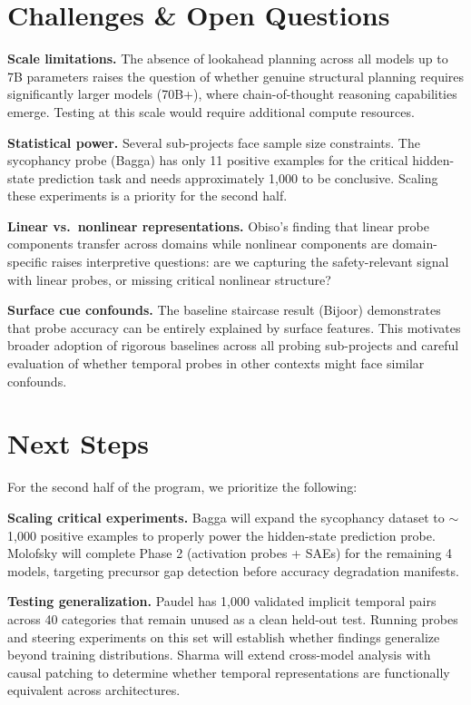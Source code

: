 \documentclass[midterm]{sparreport}
\begin{document}
\section{Challenges \& Open Questions}

\textbf{Scale limitations.} The absence of lookahead planning across all models up to 7B parameters raises the question of whether genuine structural planning requires significantly larger models (70B+), where chain-of-thought reasoning capabilities emerge. Testing at this scale would require additional compute resources.

\textbf{Statistical power.} Several sub-projects face sample size constraints. The sycophancy probe (Bagga) has only 11 positive examples for the critical hidden-state prediction task and needs approximately 1,000 to be conclusive. Scaling these experiments is a priority for the second half.

\textbf{Linear vs.\ nonlinear representations.} Obiso's finding that linear probe components transfer across domains while nonlinear components are domain-specific raises interpretive questions: are we capturing the safety-relevant signal with linear probes, or missing critical nonlinear structure?

\textbf{Surface cue confounds.} The baseline staircase result (Bijoor) demonstrates that probe accuracy can be entirely explained by surface features. This motivates broader adoption of rigorous baselines across all probing sub-projects and careful evaluation of whether temporal probes in other contexts might face similar confounds.

\section{Next Steps}

For the second half of the program, we prioritize the following:

\textbf{Scaling critical experiments.} Bagga will expand the sycophancy dataset to $\sim$1,000 positive examples to properly power the hidden-state prediction probe. Molofsky will complete Phase 2 (activation probes + SAEs) for the remaining 4 models, targeting precursor gap detection before accuracy degradation manifests.

\textbf{Testing generalization.} Paudel has 1,000 validated implicit temporal pairs across 40 categories that remain unused as a clean held-out test. Running probes and steering experiments on this set will establish whether findings generalize beyond training distributions. Sharma will extend cross-model analysis with causal patching to determine whether temporal representations are functionally equivalent across architectures.
\end{document}

